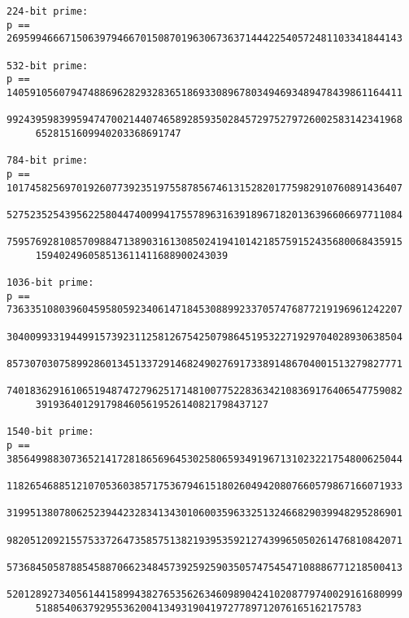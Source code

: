 \documentclass[]{article}
\begin{document}
\begin{small}
\begin{verbatim}
224-bit prime:
p == 26959946667150639794667015087019630673637144422540572481103341844143

532-bit prime:
p == 14059105607947488696282932836518693308967803494693489478439861164411
     99243959839959474700214407465892859350284572975279726002583142341968
     6528151609940203368691747

784-bit prime:
p == 10174582569701926077392351975587856746131528201775982910760891436407
     52752352543956225804474009941755789631639189671820136396606697711084
     75957692810857098847138903161308502419410142185759152435680068435915
     159402496058513611411688900243039
     
1036-bit prime:
p == 73633510803960459580592340614718453088992337057476877219196961242207
     30400993319449915739231125812675425079864519532271929704028930638504
     85730703075899286013451337291468249027691733891486704001513279827771
     74018362916106519487472796251714810077522836342108369176406547759082
     3919364012917984605619526140821798437127

1540-bit prime:
p == 38564998830736521417281865696453025806593491967131023221754800625044
     11826546885121070536038571753679461518026049420807660579867166071933
     31995138078062523944232834134301060035963325132466829039948295286901
     98205120921557533726473585751382193953592127439965050261476810842071
     57368450587885458870662348457392592590350574754547108886771218500413
     52012892734056144158994382765356263460989042410208779740029161680999
     51885406379295536200413493190419727789712076165162175783
     

\end{verbatim}
\end{small}
\end{document}
